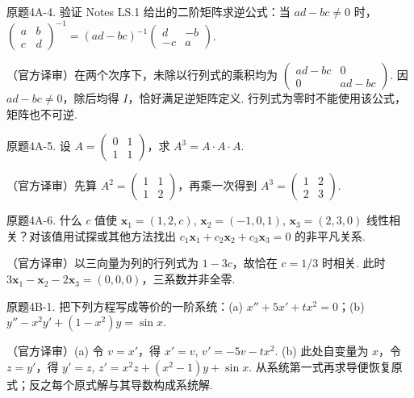 \begin{exercise}\label{cw:bank-4A-4}原题4A-4. 验证 Notes LS.1 给出的二阶矩阵求逆公式：当 $ad-bc\ne0$ 时，$\begin{pmatrix}a&b\\c&d\end{pmatrix}^{-1}=(ad-bc)^{-1}\begin{pmatrix}d&-b\\-c&a\end{pmatrix}$.\end{exercise}
\begin{solution}（官方译审）在两个次序下，未除以行列式的乘积均为 $\begin{pmatrix}ad-bc&0\\0&ad-bc\end{pmatrix}$. 因 $ad-bc\ne0$，除后均得 $I$，恰好满足逆矩阵定义. 行列式为零时不能使用该公式，矩阵也不可逆.\end{solution}
\begin{exercise}\label{cw:bank-4A-5}原题4A-5. 设 $A=\begin{pmatrix}0&1\\1&1\end{pmatrix}$，求 $A^3=A\cdot A\cdot A$.\end{exercise}
\begin{solution}（官方译审）先算 $A^2=\begin{pmatrix}1&1\\1&2\end{pmatrix}$，再乘一次得到 $A^3=\begin{pmatrix}1&2\\2&3\end{pmatrix}$.\end{solution}
\begin{exercise}\label{cw:bank-4A-6}原题4A-6. 什么 $c$ 值使 $\mathbf x_1=(1,2,c)$, $\mathbf x_2=(-1,0,1)$, $\mathbf x_3=(2,3,0)$ 线性相关？对该值用试探或其他方法找出 $c_1\mathbf x_1+c_2\mathbf x_2+c_3\mathbf x_3=0$ 的非平凡关系.\end{exercise}
\begin{solution}（官方译审）以三向量为列的行列式为 $1-3c$，故恰在 $c=1/3$ 时相关. 此时 $3\mathbf x_1-\mathbf x_2-2\mathbf x_3=(0,0,0)$，三系数并非全零.\end{solution}
\begin{exercise}\label{cw:bank-4B-1}原题4B-1. 把下列方程写成等价的一阶系统：(a) $x''+5x'+tx^2=0$；(b) $y''-x^2y'+(1-x^2)y=\sin x$.\end{exercise}
\begin{solution}（官方译审）(a) 令 $v=x'$，得 $x'=v$, $v'=-5v-tx^2$. (b) 此处自变量为 $x$，令 $z=y'$，得 $y'=z$, $z'=x^2z+(x^2-1)y+\sin x$. 从系统第一式再求导便恢复原式；反之每个原式解与其导数构成系统解.\end{solution}
